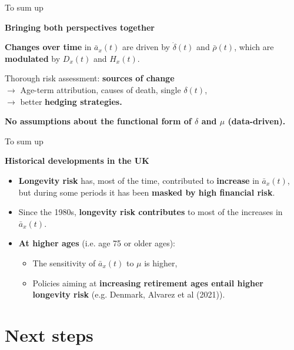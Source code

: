 \documentclass[10pt]{beamer}
\begin{document}
\begin{frame}{To sum up}

\textbf{Bringing both perspectives together} \pause
\begin{center}
	\pause
\end{center}
\textbf{Changes over time} in $\bar{a}_x(t)$ are driven by $\dot{\delta}(t)$ and $\bar{\rho}(t)$, which are \textbf{modulated} by  ${D}_x(t)$ and ${H}_x(t)$. \pause


Thorough risk assessment: \textbf{sources of change}\\
$\rightarrow$ Age-term attribution, causes of death, single $\delta(t)$, \\ \pause
 $\rightarrow$ better \textbf{hedging strategies.} \pause

\textbf{No assumptions about the functional form of $\delta$ and $\mu$ (data-driven).}



\end{frame}




\begin{frame}{To sum up}

\textbf{Historical developments in the UK}
\begin{itemize}
	\item \textbf{Longevity risk} has, most of the time, contributed to \textbf{increase} in $\bar{a}_x(t)$, but during some periods it has been \textbf{masked by high financial risk}. \pause
	\item Since the 1980s, \textbf{longevity risk contributes} to most of the increases in $\bar{a}_x(t)$. \pause
	\item \textbf{At higher ages} (i.e. age 75 or older ages): \pause
	\begin{itemize}
		\item The sensitivity of $\bar{a}_x(t)$ to $\mu$ is higher, \pause
		\item Policies aiming at \textbf{increasing retirement ages entail higher longevity risk} (e.g. Denmark, Alvarez et al (2021)).
\end{itemize}
\end{itemize}
\end{frame}

\section{Next steps}
\end{document}
